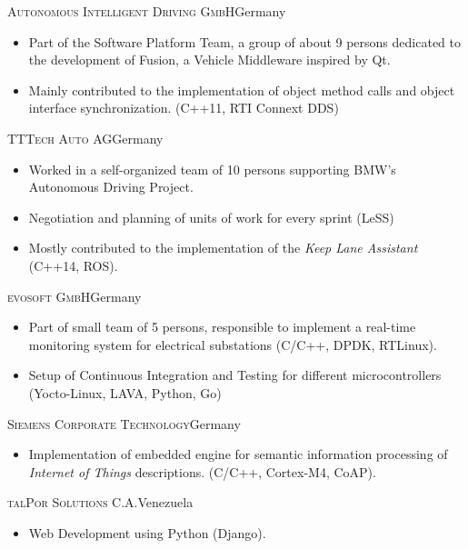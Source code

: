 \documentclass[10pt]{moderncv}
\begin{document}
{\textsc{Autonomous Intelligent Driving GmbH}}{Germany}{}{%
\begin{itemize}
  \item Part of the Software Platform Team, a group of about 9 persons dedicated to the development of Fusion, a Vehicle
      Middleware inspired by Qt.
  \item Mainly contributed to the implementation of object method calls and object interface synchronization. (C++11, RTI
      Connext DDS)
\end{itemize}
}

{\textsc{TTTech Auto AG}}{Germany}{}{%
\begin{itemize}
  \item Worked in a self-organized team of 10 persons supporting BMW's Autonomous Driving Project.
  \item Negotiation and planning of units of work for every sprint (LeSS)
  \item Mostly contributed to the implementation of the \textit{Keep Lane Assistant} (C++14, ROS).
\end{itemize}
}

{\textsc{evosoft GmbH}}{Germany}{}{%
\begin{itemize}
  \item Part of small team of 5 persons, responsible to implement a real-time monitoring system for electrical substations
      (C/C++, DPDK, RTLinux).
  \item Setup of Continuous Integration and Testing for different microcontrollers (Yocto-Linux, LAVA, Python, Go)
\end{itemize}
}

{\textsc{Siemens Corporate Technology}}{Germany}{}{%
\begin{itemize}
  \item Implementation of embedded engine for semantic information processing of \textit{Internet of Things} descriptions. (C/C++,
      Cortex-M4, CoAP).
\end{itemize}
}

{\textsc{talPor Solutions C.A.}}{Venezuela}{}{%
\begin{itemize}
  \item Web Development using Python (Django).
\end{itemize}
}
\end{document}

